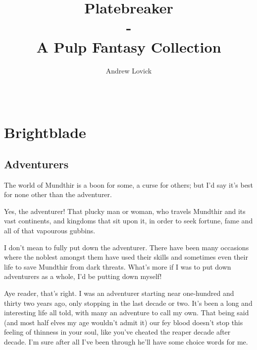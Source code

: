 \documentclass[12pt, a4paper]{book}
\title{Platebreaker\\-\\A Pulp Fantasy Collection}
\author{Andrew Lovick}
\date{}
\begin{document}
\maketitle
\clearpage
\tableofcontents
\printindex
\clearpage


\part*{
\setlength{\fboxsep}{3pt}%
\setlength{\fboxrule}{3pt}%
~\\[1cm]
Brightblade
}

\chapter{Adventurers}
The world of Mundthir is a boon for some, a curse for others; but I'd say it's best for none other than the adventurer. 

Yes, the adventurer! That plucky man or woman, who travels Mundthir and its vast continents, and kingdoms that sit upon it, in order to seek fortune, fame and all of that vapourous gubbins.

I don't mean to fully put down the adventurer. There have been many occasions where the noblest amongst them have used their skills and sometimes even their life to save Mundthir from dark threats. What's more if I was to put down adventurers as a whole, I'd be putting down myself!

Aye reader, that's right. I was an adventurer starting near one-hundred and thirty two years ago, only stopping in the last decade or two. It's been a long and interesting life all told, with many an adventure to call my own. That being said (and most half elves my age wouldn't admit it) our fey blood doesn't stop this feeling of thinness in your soul, like you've cheated the reaper decade after decade. I'm sure after all I've been through he'll have some choice words for me.
\end{document}
